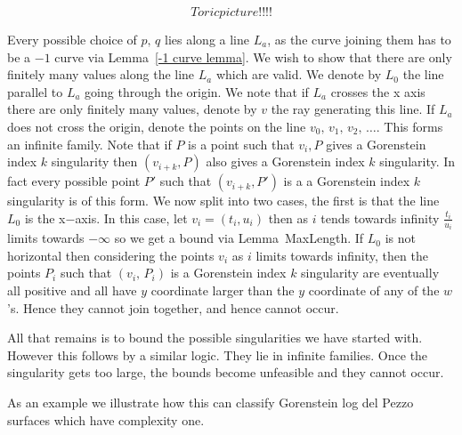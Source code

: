 \documentclass[12pt,a4paper]{book}      %
\begin{document}
\begin{algorithm}
\[
Toric picture!!!!
\] 
 
Every possible choice of $p, \, q$ lies along a line $L_a$, as the curve joining them has to be a $-1$ curve via Lemma~\ref{-1 curve lemma}. We wish to show that there are only finitely many values along the line $L_a$ which are valid. We denote by $L_0$ the line parallel to $L_a$ going through the origin. We note that if $L_a$ crosses the x axis there are only finitely many values, denote by $v$ the ray generating this line. If $L_a$ does not cross the origin, denote the points on the line $v_0, \, v_1, \, v_2, \, \dots$. This forms an infinite family. Note that if $P$ is a point such that $v_i, P$ gives a Gorenstein index $k$ singularity then $(v_{i+k}, P )$ also gives a Gorenstein index $k$ singularity. In fact every possible point $P'$ such that $(v_{i+k}, P')$ is a a Gorenstein index $k$ singularity is of this form. We now split into two cases, the first is that the line $L_0$ is the x$-$axis. In this case, let $v_i = (t_i, u_i)$ then as $i$ tends towards infinity $\frac{t_i}{u_i}$ limits towards $-\infty$ so we get a bound via Lemma~{MaxLength}. If $L_0$ is not horizontal then considering the points $v_i$ as $i$ limits towards infinity, then the points $P_i$ such that $(v_i, \, P_i)$ is a Gorenstein index $k$ singularity are eventually all positive and all have $y$ coordinate larger than the $y$ coordinate of any of the $w$'s. Hence they cannot join together, and hence cannot occur. 
 
All that remains is to bound the possible singularities we have started with. However this follows by a similar logic. They lie in infinite families. Once the singularity gets too large, the bounds become unfeasible and they cannot occur.
\end{algorithm}


As an example we illustrate how this can classify Gorenstein log del Pezzo surfaces which have complexity one.
\end{document}
